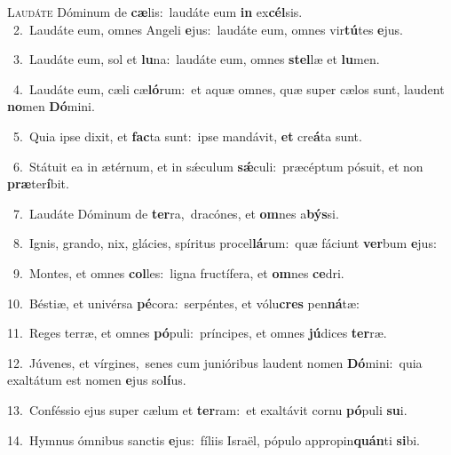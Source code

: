 \lettrine{\initial\textcolor{\initialcolor}{L}}{audáte} Dóminum de \textbf{cæ}\-lis:~\star laudáte eum \textbf{in} ex\-\textbf{cél}\-sis.\\
{\numbfont\textcolor{\numbcolor}{~2.}}~Laudáte eum, omnes Angeli \textbf{e}\-jus:~\star laudáte eum, omnes vir\-\textbf{tú}\-tes \textbf{e}\-jus.\par
{\numbfont\textcolor{\numbcolor}{~3.}}~Laudáte eum, sol et \textbf{lu}\-na:~\star laudáte eum, omnes \textbf{stel}\-læ et \textbf{lu}\-men.\par
{\numbfont\textcolor{\numbcolor}{~4.}}~Laudáte eum, cæli cæ\-\textbf{ló}\-rum:~\star et aquæ omnes, quæ super cælos sunt, laudent \textbf{no}\-men \textbf{Dó}\-mini.\par
{\numbfont\textcolor{\numbcolor}{~5.}}~Quia ipse dixit, et \textbf{fac}\-ta sunt:~\star ipse mandávit, \textbf{et} cre\-\textbf{á}\-ta sunt.\par
{\numbfont\textcolor{\numbcolor}{~6.}}~Státuit ea in ætérnum, et in sǽculum \textbf{sǽ}\-culi:~\star præcéptum pósuit, et non \textbf{præ}\-ter\-\textbf{í}\-bit.\par
{\numbfont\textcolor{\numbcolor}{~7.}}~Laudáte Dóminum de \textbf{ter}\-ra,~\star dracónes, et \textbf{om}\-nes a\-\textbf{býs}\-si.\par
{\numbfont\textcolor{\numbcolor}{~8.}}~Ignis, grando, nix, glácies, spíritus procel\-\textbf{lá}\-rum:~\star quæ fáciunt \textbf{ver}\-bum \textbf{e}\-jus:\par
{\numbfont\textcolor{\numbcolor}{~9.}}~Montes, et omnes \textbf{col}\-les:~\star ligna fructífera, et \textbf{om}\-nes \textbf{ce}\-dri.\par
{\numbfont\textcolor{\numbcolor}{10.}}~Béstiæ, et univérsa \textbf{pé}\-cora:~\star serpéntes, et vólu\textbf{cres} pen\-\textbf{ná}\-tæ:\par
{\numbfont\textcolor{\numbcolor}{11.}}~Reges terræ, et omnes \textbf{pó}\-puli:~\star príncipes, et omnes \textbf{jú}\-dices \textbf{ter}\-ræ.\par
{\numbfont\textcolor{\numbcolor}{12.}}~Júvenes, et vírgines,~\dagger senes cum junióribus laudent nomen \textbf{Dó}\-mini:~\star quia exaltátum est nomen \textbf{e}\-jus so\-\textbf{lí}\-us.\par
{\numbfont\textcolor{\numbcolor}{13.}}~Conféssio ejus super cælum et \textbf{ter}\-ram:~\star et exaltávit cornu \textbf{pó}\-puli \textbf{su}\-i.\par
{\numbfont\textcolor{\numbcolor}{14.}}~Hymnus ómnibus sanctis \textbf{e}\-jus:~\star fíliis Israël, pópulo appropin\-\textbf{quán}\-ti \textbf{si}\-bi.\par
